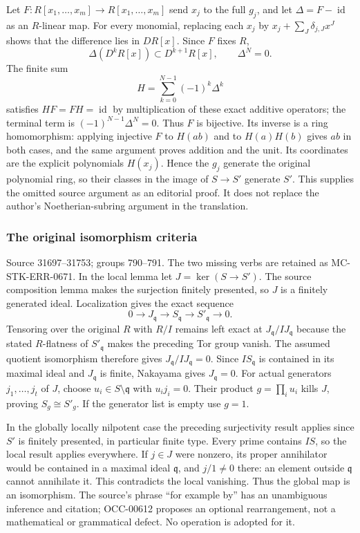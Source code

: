 Let \(F:R[x_1,\ldots,x_m]\to R[x_1,\ldots,x_m]\) send \(x_j\) to the full \(g_j\), and let \(\Delta=F-\operatorname{id}\) as an \(R\)-linear map. For every monomial, replacing each \(x_j\) by \(x_j+\sum_J\delta_{j,J}x^J\) shows that the difference lies in \(D R[x]\). Since \(F\) fixes \(R\), \[
\Delta(D^kR[x])\subset D^{k+1}R[x],\qquad \Delta^N=0.
\] The finite sum \[
H=\sum_{k=0}^{N-1}(-1)^k\Delta^k
\] satisfies \(HF=FH=\operatorname{id}\) by multiplication of these exact additive operators; the terminal term is \((-1)^{N-1}\Delta^N=0\). Thus \(F\) is bijective. Its inverse is a ring homomorphism: applying injective \(F\) to \(H(ab)\) and to \(H(a)H(b)\) gives \(ab\) in both cases, and the same argument proves addition and the unit. Its coordinates are the explicit polynomials \(H(x_j)\). Hence the \(g_j\) generate the original polynomial ring, so their classes in the image of \(S\to S'\) generate \(S'\). This supplies the omitted source argument as an editorial proof. It does not replace the author's Noetherian-subring argument in the translation.

\subsubsection{The original isomorphism criteria}\label{algebra-proof-035-the-original-isomorphism-criteria}

Source 31697--31753; groups 790--791. The two missing verbs are retained as MC-STK-ERR-0671. In the local lemma let \(J=\ker(S\to S')\). The source composition lemma makes the surjection finitely presented, so \(J\) is a finitely generated ideal. Localization gives the exact sequence \[
0\to J_{\mathfrak q}\to S_{\mathfrak q}\to S'_{\mathfrak q}\to0.
\] Tensoring over the original \(R\) with \(R/I\) remains left exact at \(J_{\mathfrak q}/IJ_{\mathfrak q}\) because the stated \(R\)-flatness of \(S'_{\mathfrak q}\) makes the preceding Tor group vanish. The assumed quotient isomorphism therefore gives \(J_{\mathfrak q}/IJ_{\mathfrak q}=0\). Since \(IS_{\mathfrak q}\) is contained in its maximal ideal and \(J_{\mathfrak q}\) is finite, Nakayama gives \(J_{\mathfrak q}=0\). For actual generators \(j_1,\ldots,j_t\) of \(J\), choose \(u_i\in S\setminus\mathfrak q\) with \(u_i j_i=0\). Their product \(g=\prod_i u_i\) kills \(J\), proving \(S_g\cong S'_g\). If the generator list is empty use \(g=1\).

In the globally locally nilpotent case the preceding surjectivity result applies since \(S'\) is finitely presented, in particular finite type. Every prime contains \(IS\), so the local result applies everywhere. If \(j\in J\) were nonzero, its proper annihilator would be contained in a maximal ideal \(\mathfrak q\), and \(j/1\ne0\) there: an element outside \(\mathfrak q\) cannot annihilate it. This contradicts the local vanishing. Thus the global map is an isomorphism. The source's phrase ``for example by'' has an unambiguous inference and citation; OCC-00612 proposes an optional rearrangement, not a mathematical or grammatical defect. No operation is adopted for it.

